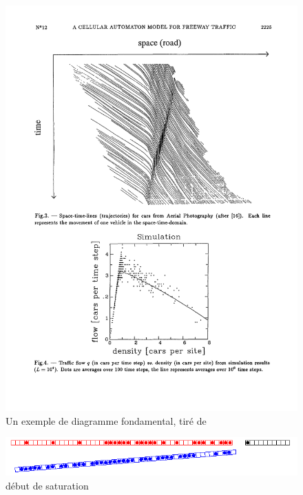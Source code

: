 \documentclass[11pt]{article}
\begin{document}
\begin{figure}[h]
	\begin{center}	
		\includegraphics[scale = 1]{./images/dfondcomp}
	\end{center}
	\caption{\label{dgf} Un exemple de diagramme fondamental, tiré de \cite{NaSch}}
\end{figure}

	\begin{figure}[h]
		\begin{center}
			\includegraphics[scale=0.8]{./images/localsature}
		\end{center}
		\caption{\label{dsat}début de saturation}
	\end{figure}
\end{document}
